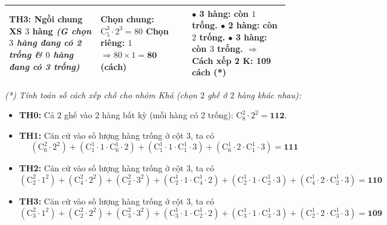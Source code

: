 \begin{ex}
{\begin{center}
\begin{tabular}{|p{0.3\linewidth}|p{0.3\linewidth}|p{0.32\linewidth}|}
				\textbf{TH3: Ngồi chung XS $3$ hàng} \newline
				\textit{(G chọn $3$ hàng đang có 2 trống \newline \& $0$ hàng đang có 3 trống)}
				& Chọn chung: $\mathrm{C}_5^3 \cdot 2^3 = 80$ \newline
				Chọn riêng: $1$ \newline
				$\Rightarrow 80 \times 1 = \mathbf{80}$ (cách)
				& $\bullet$ \textbf{3 hàng:} còn $1$ trống. \newline
				$\bullet$ \textbf{2 hàng:} còn $2$ trống. \newline
				$\bullet$ \textbf{3 hàng:} còn $3$ trống. \newline
				$\Rightarrow$ Cách xếp 2 K: \textbf{109 cách (*)} \\ \hline
			\end{tabular}
		\end{center}
		\textit{(*) Tính toán số cách xếp chỗ cho nhóm Khá (chọn $2$ ghế ở $2$ hàng khác nhau):}
		\begin{itemize}
			\item \textbf{TH0:} Cả $2$ ghế vào $2$ hàng bất kỳ (mỗi hàng có 2 trống): $\mathrm{C}_8^2 \cdot 2^2 = \mathbf{112}$.
			\item \textbf{TH1:} Căn cứ vào số lượng hàng trống ở cột 3, ta có $$(\mathrm{C}_6^2 \cdot 2^2) + (\mathrm{C}_1^1 \cdot 1 \cdot \mathrm{C}_6^1 \cdot 2) + (\mathrm{C}_1^1 \cdot 1 \cdot \mathrm{C}_1^1 \cdot 3) + (\mathrm{C}_6^1 \cdot 2 \cdot \mathrm{C}_1^1 \cdot 3) = \mathbf{111}$$
			\item \textbf{TH2:} Căn cứ vào số lượng hàng trống ở cột 3, ta có $$(\mathrm{C}_2^2 \cdot 1^2) + (\mathrm{C}_4^2 \cdot 2^2) + (\mathrm{C}_2^2 \cdot 3^2) + (\mathrm{C}_2^1 \cdot 1 \cdot \mathrm{C}_4^1 \cdot 2) + (\mathrm{C}_2^1 \cdot 1 \cdot \mathrm{C}_2^1 \cdot 3) + (\mathrm{C}_4^1 \cdot 2 \cdot \mathrm{C}_2^1 \cdot 3) = \mathbf{110}$$
			\item \textbf{TH3:} Căn cứ vào số lượng hàng trống ở cột 3, ta có $$(\mathrm{C}_3^2 \cdot 1^2) + (\mathrm{C}_2^2 \cdot 2^2) + (\mathrm{C}_3^2 \cdot 3^2) + (\mathrm{C}_3^1 \cdot 1 \cdot \mathrm{C}_2^1 \cdot 2) + (\mathrm{C}_3^1 \cdot 1 \cdot \mathrm{C}_3^1 \cdot 3) + (\mathrm{C}_2^1 \cdot 2 \cdot \mathrm{C}_3^1 \cdot 3) = \mathbf{109}$$
		\end{itemize}
		
}
\end{ex}
